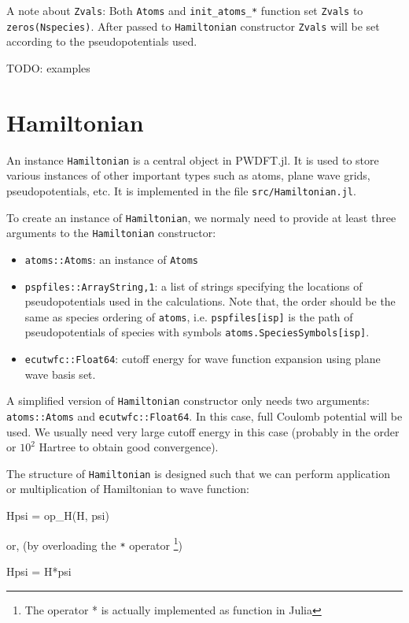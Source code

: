 \documentclass[a4paper,10pt]{paper}
\newcommand{\jlcode}[1]{\texttt{#1}}
\begin{document}
A note about \jlcode{Zvals}: Both \jlcode{Atoms} and \jlcode{init_atoms_*} function set
\jlcode{Zvals} to \jlcode{zeros(Nspecies)}. After passed to \jlcode{Hamiltonian} constructor
\jlcode{Zvals} will be set according to the pseudopotentials used.

TODO: examples

\section{Hamiltonian}

An instance \jlcode{Hamiltonian} is a central object in \textsf{PWDFT.jl}.
It is used to store various instances of other important types
such as atoms, plane wave grids, pseudopotentials, etc.
It is implemented in the file \texttt{src/Hamiltonian.jl}.

To create an instance of \jlcode{Hamiltonian}, we normaly need to provide at least
three arguments to the \jlcode{Hamiltonian} constructor:
%
\begin{itemize}
%
\item \jlcode{atoms::Atoms}: an instance of \jlcode{Atoms}
%
\item \jlcode{pspfiles::Array{String,1}}: a list of strings specifying the
  locations of pseudopotentials used in the
  calculations. Note that, the order should be the same as species ordering
  of \jlcode{atoms}, i.e. \jlcode{pspfiles[isp]} is the path of
  pseudopotentials of species with symbols \jlcode{atoms.SpeciesSymbols[isp]}.
%
\item \jlcode{ecutwfc::Float64}: cutoff energy for wave function
  expansion using plane wave basis set.
\end{itemize}

A simplified version of \jlcode{Hamiltonian} constructor only needs two arguments:
\jlcode{atoms::Atoms} and \jlcode{ecutwfc::Float64}. In this case, full Coulomb potential
will be used. We usually need very large cutoff energy in this case (probably
in the order or $10^2$ Hartree to obtain good convergence).

The structure of \jlcode{Hamiltonian} is designed such that we can perform
application or multiplication of Hamiltonian to wave function:
%
\begin{juliacode}
Hpsi = op_H(H, psi)
\end{juliacode}
%
or, (by overloading the \jlcode{*} operator
\footnote{The operator * is actually implemented as function in Julia})
%
\begin{juliacode}
Hpsi = H*psi
\end{juliacode}
\end{document}
